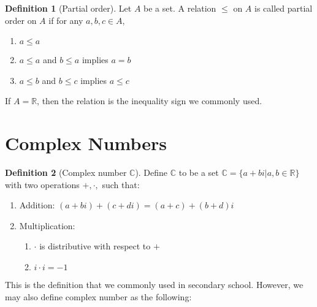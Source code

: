 \documentclass{article}
\theoremstyle{MyNonumberplain}
\theoremstyle{break}
\newcommand{\R}{\mathbb{R}}
\newcommand{\C}{\mathbb{C}}
\theoremstyle{break}
\theoremstyle{break}
\theoremstyle{definition}
\theoremstyle{break}
\newtheorem{definition}{Definition}[section]
\begin{document}
\begin{defbox}
    \begin{definition}[Partial order]
        Let $A$ be a set. A relation $\leq$ on $A$ is called partial order on $A$ if for any $a,b,c\in A$,
        \begin{enumerate}
            \item $a \leq a$
            \item $a \leq a$ and $b \leq a$ implies $a=b$
            \item $a \leq b$ and $b \leq c$ implies $a \leq c$
        \end{enumerate}
    \end{definition}
\end{defbox}

If $A=\R$, then the relation is the inequality sign we commonly used.

\newpage

\section{Complex Numbers}

\begin{defbox}
    \begin{definition}[Complex number $\C$]
        Define $\C$ to be a set $\C=\{a+bi|a,b\in\R\}$ with two operations $+,\cdot,$ such that:\\
        \begin{enumerate}
            \item Addition: $(a+bi)+(c+di)=(a+c)+(b+d)i$\\
            \item Multiplication:\\
            \begin{enumerate}
                \item $\cdot$ is distributive with respect to $+$\\
                \item $i\cdot i=-1$
            \end{enumerate}
        \end{enumerate}
    \end{definition}
\end{defbox}

This is the definition that we commonly used in secondary school. However, we may also define complex number as the following:
\end{document}

